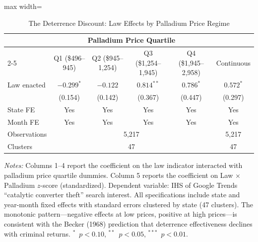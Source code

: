 \begin{table}[htbp]
\centering
\caption{The Deterrence Discount: Law Effects by Palladium Price Regime}
\label{tab:deterrence_discount}
\begin{adjustbox}{max width=\textwidth}
\begin{tabular}{lccccc}
\hline\hline
 & \multicolumn{4}{c}{Palladium Price Quartile} & \\
\cline{2-5}
 & Q1 (\$496--945) & Q2 (\$945--1,254) & Q3 (\$1,254--1,945) & Q4 (\$1,945--2,958) & Continuous \\
\hline
Law enacted & $-0.299^{*}$ & $-0.122$ & $0.814^{**}$ & $0.786^{*}$ & $0.572^{*}$ \\
 & (0.154) & (0.142) & (0.367) & (0.447) & (0.297) \\
\hline
State FE & Yes & Yes & Yes & Yes & Yes \\
Month FE & Yes & Yes & Yes & Yes & Yes \\
Observations & \multicolumn{4}{c}{5,217} & 5,217 \\
Clusters & \multicolumn{4}{c}{47} & 47 \\
\hline\hline
\end{tabular}
\end{adjustbox}
\begin{tablenotes}[flushleft]
\small
\item \textit{Notes:} Columns 1--4 report the coefficient on the law indicator interacted with palladium price quartile dummies. Column 5 reports the coefficient on Law $\times$ Palladium $z$-score (standardized). Dependent variable: IHS of Google Trends ``catalytic converter theft'' search interest. All specifications include state and year-month fixed effects with standard errors clustered by state (47 clusters). The monotonic pattern---negative effects at low prices, positive at high prices---is consistent with the Becker (1968) prediction that deterrence effectiveness declines with criminal returns. $^{*}$~$p<0.10$, $^{**}$~$p<0.05$, $^{***}$~$p<0.01$.
\end{tablenotes}
\end{table}
